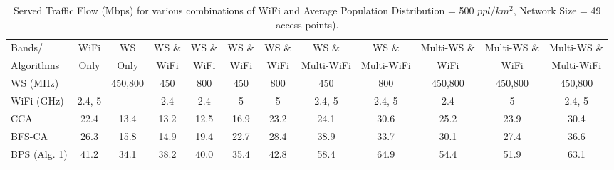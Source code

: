 \begin{table}
\centering %
\begin{tabular}{|l|c|c|c|c|c|c|c|c|c|c|c|} %
\hline %
Bands/     & WiFi    & WS      & WS \& & WS \& &  WS \& & WS \& & WS \&      &  WS \&      & Multi-WS \& & Multi-WS \& & Multi-WS \& \\%
Algorithms & Only    & Only    & WiFi  & WiFi  &  WiFi  & WiFi  & Multi-WiFi &  Multi-WiFi & WiFi        & WiFi        & Multi-WiFi  \\
\hline %
WS (MHz)   &                                                        & 450,800 & 450 &  800  &  450   & 800               & 450    & 800      & 450,800     & 450,800     & 450,800     \\
\hline
WiFi (GHz) & 2.4, 5 &                                                             & 2.4 &  2.4  &  5   & 5               & 2.4, 5& 2.4, 5        & 2.4             & 5         & 2.4, 5     \\ %
\hline
\hline %
CCA~\cite{draves2004routing}                & 22.4   &  13.4  & 13.2    &12.5    & 16.9       & 23.2   &  24.1  &   30.6&  25.2  &       23.9       &   30.4          \\      
\hline %
BFS-CA~\cite{ramachandran2006interference}  & 26.3   &  15.8  & 14.9    & 19.4   & 22.7       & 28.4   &  38.9  &   33.7&  30.1  &       27.4       &       36.6      \\      
\hline %
BPS (Alg. 1)                                & 41.2   & 34.1   &  38.2  & 40.0    & 35.4       & 42.8   & 58.4   &  64.9 &  54.4  &       51.9       &       63.1      \\      
\hline %
\end{tabular}    
\caption{ Served Traffic Flow (Mbps) for various combinations of WiFi and Average Population Distribution = 500 $ppl/km^2$, Network Size = 49 access points).} %
\label{tab:2channelcombination}    
\vspace{-0.4in}
\end{table}    


